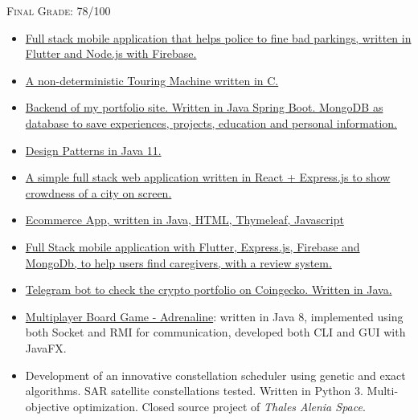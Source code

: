 \documentclass[10pt,a4paper]{altacv}
\begin{document}
\textsc{Final Grade}: 78/100

 \divider


\begin{itemize}
\item \href{https://github.com/fedy97/SafeStreets-Frontend-Flutter}{Full stack mobile application that helps police to fine bad parkings, written in Flutter and Node.js with Firebase.}
\item \href{https://github.com/fedy97/Progetto-Api-2018-Polimi}{A non-deterministic Touring Machine written in C.}
\item \href{https://github.com/fedy97/telegram-crypto-bot}{Backend of my portfolio site. Written in Java Spring Boot. MongoDB as database to save experiences, projects, education and personal information.}
\item \href{https://github.com/fedy97/Design-Patterns}{Design Patterns in Java 11.}
\item \href{https://github.com/fedy97/digital-innovation-lab-2020}{A simple full stack web application written in React + Express.js to show crowdness of a city on screen.}
\item \href{https://github.com/fedy97/TIW_HTML-2020-2021}{Ecommerce App, written in Java, HTML, Thymeleaf, Javascript}
\item \href{https://github.com/fedy97/Baddy-full-stack-app}{Full Stack mobile application with Flutter, Express.js, Firebase and MongoDb, to help users find caregivers, with a review system.}
\item \href{https://github.com/fedy97/telegram-crypto-bot}{Telegram bot to check the crypto portfolio on Coingecko. Written in Java.}
\item \href{https://github.com/fedy97/ing-sw-2019-morreale-marini-orlando}{Multiplayer Board Game - Adrenaline}: written in Java 8, implemented using both Socket and RMI for communication, developed both CLI and GUI with JavaFX.
\item Development of an innovative constellation scheduler using genetic and exact algorithms. SAR satellite constellations tested. Written in Python 3. Multi-objective optimization. Closed source project of \textit{Thales Alenia Space}.
\end{itemize}


\clearpage
\end{document}
